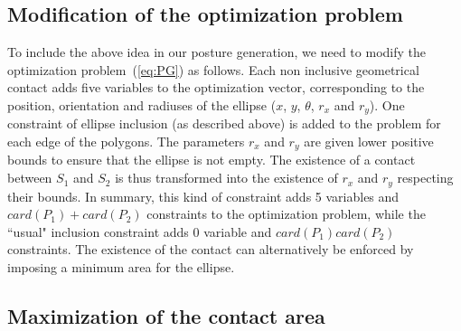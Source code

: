 \subsection{Modification of the optimization problem}
To include the above idea in our posture generation, we need to modify the optimization problem~(\ref{eq:PG}) as follows.
Each non inclusive geometrical contact adds five variables to the optimization vector, corresponding to the position, orientation and radiuses of the ellipse ($x$, $y$, $\theta$, $r_x$ and $r_y$). One constraint of ellipse inclusion (as described above) is added to the problem for each edge of the polygons. The parameters $r_x$ and $r_y$ are given lower positive bounds to ensure that the ellipse is not empty. The existence of a contact between $S_1$ and $S_2$ is thus transformed into the existence of $r_x$ and $r_y$ respecting their bounds.
In summary, this kind of constraint adds 5 variables and $card(P_1)+card(P_2)$ constraints to the optimization problem, while the ``usual" inclusion constraint adds 0 variable and $card(P_1)card(P_2)$ constraints.
The existence of the contact can alternatively be enforced by imposing a minimum area for the ellipse.

\subsection{Maximization of the contact area}
\label{subsec:optim-ellipse-area}

